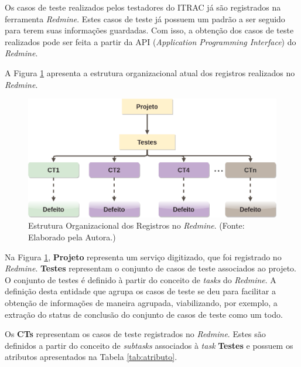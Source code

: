 Os casos de teste realizados pelos testadores do ITRAC já são registrados na ferramenta \textit{Redmine}. Estes casos de teste já possuem um padrão a ser seguido para terem suas informações guardadas. Com isso, a obtenção dos casos de teste realizados pode ser feita a partir da API (\textit{Application Programming Interface}) do \textit{Redmine}.

A Figura \ref{fig:registro} apresenta a estrutura organizacional atual dos registros realizados no \textit{Redmine}.


        \begin{figure}[h]
          \centering
          \includegraphics[width=15cm]{figuras/registro.png}
          \caption{Estrutura Organizacional dos Registros no \textit{Redmine}. (Fonte: Elaborado pela Autora.)}
          \label{fig:registro}

        \end{figure}

Na Figura \ref{fig:registro}, \textbf{Projeto} representa um serviço digitizado, que foi registrado no \textit{Redmine}. \textbf{Testes} representam o conjunto de casos de teste associados ao projeto. O conjunto de testes é definido à partir do conceito de \textit{tasks} do \textit{Redmine}. A definição desta entidade que agrupa os casos de teste se deu para facilitar a obtenção de informações de maneira agrupada, viabilizando, por exemplo, a extração do status de conclusão do conjunto de casos de teste como um todo.

Os \textbf{CTs} representam os casos de teste registrados no \textit{Redmine}. Estes são definidos a partir do conceito de \textit{subtasks} associados à \textit{task} \textbf{Testes} e possuem os atributos apresentados na Tabela \ref{tab:atributo}.

